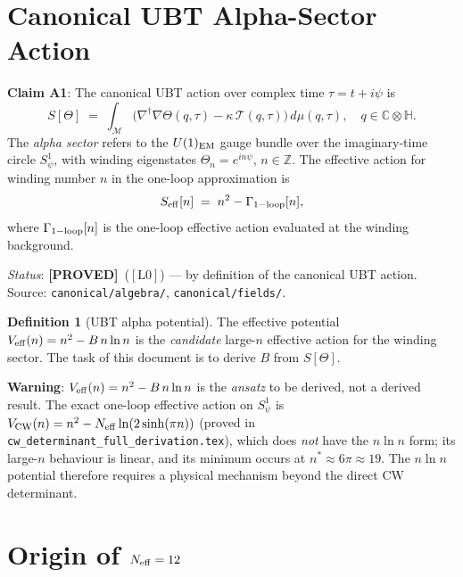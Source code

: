 \documentclass[12pt,a4paper]{article}
\theoremstyle{definition}
\newtheorem{definition}[theorem]{Definition}
\theoremstyle{remark}
\newcommand{\PROVED}{\textcolor{green!60!black}{\textbf{[PROVED]}}}
\newcommand{\Lzero}{$[\mathrm{L0}]$}
\newcommand{\Neff}{N_{\mathrm{eff}}}
\newcommand{\CC}{\mathbb{C}}
\newcommand{\HH}{\mathbb{H}}
\newcommand{\ZZ}{\mathbb{Z}}
\begin{document}
\section{Canonical UBT Alpha-Sector Action}
\label{sec:eta:action}

\begin{resultbox}
\textbf{Claim A1}: The canonical UBT action over complex time
$\tau = t + i\psi$ is
\[
  S[\Theta] \;=\; \int_{\mathcal{M}} \bigl(
    \nabla^\dagger\nabla\Theta(q,\tau)
    - \kappa\,\mathcal{T}(q,\tau)
  \bigr)\,d\mu(q,\tau),
  \quad q \in \CC\otimes\HH.
\]
The \emph{alpha sector} refers to the $U(1)_{\rm EM}$ gauge bundle over
the imaginary-time circle $S^1_\psi$, with winding eigenstates
$\Theta_n = e^{in\psi}$, $n\in\ZZ$.  The effective action for winding
number $n$ in the one-loop approximation is
\[
  S_{\rm eff}[n] \;=\; n^2 - \Gamma_{1{\rm-loop}}[n],
\]
where $\Gamma_{1{\rm-loop}}[n]$ is the one-loop effective action evaluated
at the winding background.
\end{resultbox}

\noindent\textit{Status}: \PROVED\ (\Lzero) — by definition of the canonical
UBT action.  Source: \texttt{canonical/algebra/},
\texttt{canonical/fields/}.

\begin{definition}[UBT alpha potential]
The effective potential $V_{\rm eff}(n) = n^2 - B\,n\ln n$ is the
\emph{candidate} large-$n$ effective action for the winding sector.
The task of this document is to derive $B$ from $S[\Theta]$.
\end{definition}

\begin{warnbox}
\textbf{Warning}: $V_{\rm eff}(n) = n^2 - B\,n\ln n$ is the \emph{ansatz}
to be derived, not a derived result.  The exact one-loop effective action on
$S^1_\psi$ is $V_{\rm CW}(n) = n^2 - \Neff\ln(2\sinh(\pi n))$
(proved in \texttt{cw\_determinant\_full\_derivation.tex}), which does
\emph{not} have the $n\ln n$ form; its large-$n$ behaviour is linear, and
its minimum occurs at $n^* \approx 6\pi \approx 19$.  The $n\ln n$ potential
therefore requires a physical mechanism beyond the direct CW determinant.
\end{warnbox}

\section{Origin of $N_{\rm eff} = 12$}
\label{sec:eta:neff}
\end{document}
